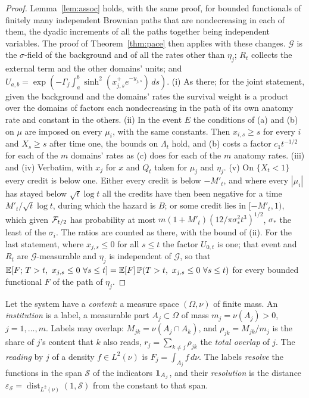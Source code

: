 \begin{proof}
Lemma~\ref{lem:assoc} holds, with the same proof, for bounded functionals
of finitely many independent Brownian paths that are nondecreasing in
each of them, the dyadic increments of all the paths together being
independent variables. The proof of Theorem~\ref{thm:pace} then applies
with these changes. $\mathcal G$ is the $\sigma$-field of the background
and of all the rates other than $\eta_j$; $R_t$ collects the external term
and the other domains' units; and
$U_{a,b}=\exp(-\Gamma_j\int_a^b\sinh^2(x_{j,s}^+e^{-y_{j,s}})\,ds)$. (i) As
there; for the joint statement, given the background and the domains'
rates the survival weight is a product over the domains of factors each
nondecreasing in the path of its own anatomy rate and constant in the
others. (ii) In the event $E$ the conditions of (a) and (b) on $\mu$ are
imposed on every $\mu_i$, with the same constants. Then $x_{i,s}\ge s$ for
every $i$ and $X_s\ge s$ after time one, the bounds on $\Lambda_t$ hold,
and (b) costs a factor $c_1t^{-1/2}$ for each of the $m$ domains' rates as
(c) does for each of the $m$ anatomy rates. (iii) and (iv) Verbatim, with
$x_j$ for $x$ and $Q_t$ taken for $\mu_j$ and $\eta_j$. (v) On
$\{X_t<1\}$ every credit is below one. Either every credit is below
$-M'_t$, and where every $|\mu_i|$ has stayed below $\sqrt t\log t$ all
the credits have then been negative for a time $M'_t/\sqrt t\log t$,
during which the hazard is $B$; or some credit lies in $[-M'_t,1)$, which
given $\mathcal{F}_{t/2}$ has probability at most
$m(1+M'_t)(12/\pi\sigma_\ast^2t^3)^{1/2}$, $\sigma_\ast$ the least of the
$\sigma_i$. The ratios are counted as there, with the bound of (ii). For
the last statement, where $x_{j,s}\le0$ for all $s\le t$ the factor
$U_{0,t}$ is one; that event and $R_t$ are $\mathcal G$-measurable and
$\eta_j$ is independent of $\mathcal G$, so that
$\mathbb{E}[F;\,T>t,\ x_{j,s}\le0\ \forall s\le t]=\mathbb{E}[F]\,\mathbb{P}(T>t,\ x_{j,s}\le0\ \forall s\le t)$
for every bounded functional $F$ of the path of $\eta_j$.
\end{proof}

\begin{definition}\label{def:labels}
Let the system have a \emph{content}: a measure space $(\Omega,\nu)$ of
finite mass. An \emph{institution} is a label, a measurable part
$A_j\subset\Omega$ of mass $m_j=\nu(A_j)>0$, $j=1,\dots,m$. Labels may
overlap: $M_{jk}=\nu(A_j\cap A_k)$, and $\rho_{jk}=M_{jk}/m_j$ is the
share of $j$'s content that $k$ also reads, $r_j=\sum_{k\neq j}\rho_{jk}$
the \emph{total overlap} of $j$. The \emph{reading} by $j$ of a density
$f\in L^2(\nu)$ is $F_j=\int_{A_j}f\,d\nu$. The labels \emph{resolve} the
functions in the span $\mathcal S$ of the indicators $\mathbf{1}_{A_j}$, and
their \emph{resolution} is the distance
$\varepsilon_{\mathcal S}=\operatorname{dist}_{L^2(\nu)}(1,\mathcal S)$
from the constant to that span.
\end{definition}


